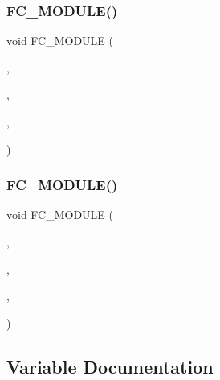 \hypertarget{SpecialKernels_8H_a002d7021c6aa674ac4130544ba0824c0}{}\label{SpecialKernels_8H_a002d7021c6aa674ac4130544ba0824c0} 
\subsubsection{\texorpdfstring{F\+C\+\_\+\+M\+O\+D\+U\+L\+E()}{FC\_MODULE()}\hspace{0.1cm}{\footnotesize\ttfamily [3/4]}}
{\footnotesize\ttfamily void F\+C\+\_\+\+M\+O\+D\+U\+LE (\begin{DoxyParamCaption}\item[{special}]{,  }\item[{determinant2x2}]{,  }\item[{S\+P\+E\+C\+I\+AL}]{,  }\item[{D\+E\+T\+E\+R\+M\+I\+N\+A\+N\+T2\+X2}]{ }\end{DoxyParamCaption})}

\hypertarget{SpecialKernels_8H_aec2fc1c0b85dd43bbf27b26b82e172ad}{}\label{SpecialKernels_8H_aec2fc1c0b85dd43bbf27b26b82e172ad} 
\subsubsection{\texorpdfstring{F\+C\+\_\+\+M\+O\+D\+U\+L\+E()}{FC\_MODULE()}\hspace{0.1cm}{\footnotesize\ttfamily [4/4]}}
{\footnotesize\ttfamily void F\+C\+\_\+\+M\+O\+D\+U\+LE (\begin{DoxyParamCaption}\item[{special}]{,  }\item[{metricsum4}]{,  }\item[{S\+P\+E\+C\+I\+AL}]{,  }\item[{M\+E\+T\+R\+I\+C\+S\+U\+M4}]{ }\end{DoxyParamCaption})}



\subsection{Variable Documentation}
\hypertarget{SpecialKernels_8H_a595273dc3902920c0056b8a1ef9bff5e}{}\label{SpecialKernels_8H_a595273dc3902920c0056b8a1ef9bff5e} 
